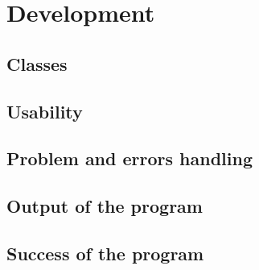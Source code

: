\chapter{Development}
\section{Classes}
\section{Usability}
\section{Problem and errors handling}
\section{Output of the program}
\section{Success of the program}
